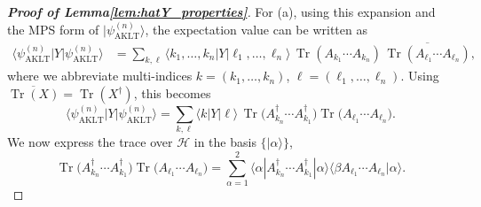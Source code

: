 \documentclass[11pt,a4paper]{article}
\begin{document}
\begin{proof}[\textbf{Proof of Lemma\ref{lem:hatY_properties}}]
 For (a),  using this expansion and the MPS form of \(|\psi_{\mathrm{AKLT}}^{(n)}\rangle\), the expectation value can be written as
\begin{align*}
\langle\psi_{\mathrm{AKLT}}^{(n)}|Y|\psi_{\mathrm{AKLT}}^{(n)}\rangle
&=
\sum_{k,\ell}
\langle k_1,\dots,k_n|Y|\ell_1,\dots,\ell_n\rangle\,
\operatorname{Tr}(A_{k_1}\cdots A_{k_n})\,
\overline{\operatorname{Tr}(A_{\ell_1}\cdots A_{\ell_n})},
\end{align*}
where we abbreviate multi-indices \(k=(k_1,\dots,k_n)\), \(\ell=(\ell_1,\dots,\ell_n)\). Using \(\overline{\operatorname{Tr}(X)}=\operatorname{Tr}(X^{\dagger})\), this becomes
\[
\langle\psi_{\mathrm{AKLT}}^{(n)}|Y|\psi_{\mathrm{AKLT}}^{(n)}\rangle
=
\sum_{k,\ell}
\langle k|Y|\ell\rangle\,
\operatorname{Tr}\bigl(A_{k_n}^{\dagger}\cdots A_{k_1}^{\dagger}\bigr)\operatorname{Tr}\bigl(A_{\ell_1}\cdots A_{\ell_n}\bigr).
\]
We now express the trace over \(\mathcal{H}\) in the basis \(\{|\alpha\rangle\}\),
\[
\operatorname{Tr}\bigl(A_{k_n}^{\dagger}\cdots A_{k_1}^{\dagger}\bigr)\operatorname{Tr}\bigl(A_{\ell_1}\cdots A_{\ell_n}\bigr)
=
\sum_{\alpha=1}^{2}
\langle\alpha|A_{k_n}^{\dagger}\cdots A_{k_1}^{\dagger}|\alpha\rangle\langle \beta A_{\ell_1}\cdots A_{\ell_n}|\alpha\rangle.
\]


\end{proof}
\end{document}
